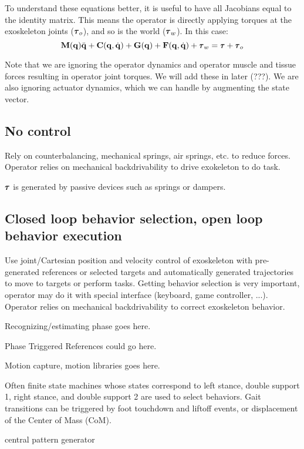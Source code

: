 \documentclass[letterpaper,12pt,fullpage]{article}
\begin{document}
To understand these equations better, it is useful to have all Jacobians equal
to the identity matrix. This means the operator is directly applying torques
at the exoskeleton joints ($\vtau_o$), and so is the world ($\vtau_w$). In this case:
\begin{equation}
\mM(\vq) \ddot{\vq} + \mC(\vq,\dot{\vq}) + \mG(\vq) + \mF(\vq,\dot{\vq})
+ \vtau_w = \vtau + \vtau_o
\end{equation}

Note that we are ignoring the operator dynamics and operator muscle and tissue
forces resulting in operator joint torques. We will add these in later (???).
We are also ignoring actuator dynamics, which we can handle by augmenting 
the state vector.

\subsection{No control}

Rely on counterbalancing, mechanical springs, air springs, etc.
to reduce forces. 
Operator relies on mechanical backdrivability to drive
exokeleton to do task.

$\vtau$ is generated by passive devices such as springs or dampers.

\subsection{Closed loop behavior selection, open loop behavior
execution}

Use joint/Cartesian position and velocity control of exoskeleton 
with pre-generated references or selected targets and automatically generated trajectories to move to targets or perform tasks.
Getting behavior selection is very important, operator may do it with
special interface (keyboard, game controller, ...).
Operator relies on mechanical backdrivability to correct exoskeleton behavior.

Recognizing/estimating phase goes here.

Phase Triggered References could go here.

Motion capture, motion libraries goes here.

Often finite state machines whose states correspond to left stance, double support 1,
right stance, and double support 2 are used to select behaviors. Gait transitions
can be triggered by foot touchdown and liftoff events, or
displacement of the Center of Mass (CoM).

central pattern generator
\end{document}
